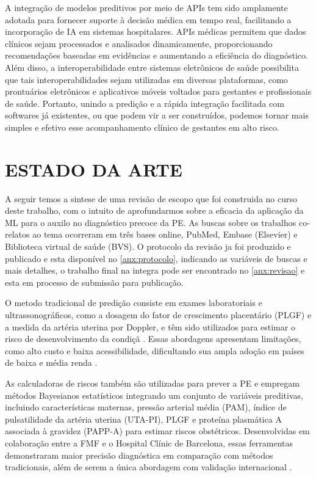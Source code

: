 \documentclass[12pt, a4paper]{report}
\theoremstyle{definition}
\theoremstyle{remark}
\theoremstyle{plain}
\begin{document}
A integração de modelos preditivos por meio de APIs tem sido amplamente adotada para fornecer suporte à decisão médica em tempo real, facilitando a incorporação de IA em sistemas hospitalares. APIs médicas permitem que dados clínicos sejam processados e analisados dinamicamente, proporcionando recomendações baseadas em evidências e aumentando a eficiência do diagnóstico\cite{mandel2016}. Além disso, a interoperabilidade entre sistemas eletrônicos de saúde possibilita que tais interoperabilidades sejam utilizadas em diversas plataformas, como prontuários eletrônicos e aplicativos móveis voltados para gestantes e profissionais de saúde\cite{himss2020}. Portanto, unindo a predição e a rápida integração facilitada com softwares já existentes, ou que podem vir a ser construídos, podemos tornar mais simples e efetivo esse acompanhamento clínico de gestantes em alto risco.


\chapter{ESTADO DA ARTE}
\thispagestyle{myheadings}

A seguir temos a sintese de uma revisão de escopo que foi construida no curso deste trabalho, com o intuito de aprofundarmos sobre a eficacia da aplicação da ML para o auxilo no diagnóstico precoce da PE. As buscas sobre os trabalhos co-relatos ao tema ocorreram em três bases online, PubMed, Embase (Elsevier) e Biblioteca virtual de saúde (BVS). O protocolo da revisão ja foi produzido e publicado e esta disponível no \autoref{anx:protocolo}, indicando as variáveis de buscas e mais detalhes, o trabalho final na integra pode ser encontrado no \autoref{anx:revisao} e esta em processo de submissão para publicação.

O metodo tradicional de predição consiste em exames laboratoriais e ultrassonográficos, como a dosagem do fator de crescimento placentário (PLGF) e a medida da artéria uterina por Doppler, e têm sido utilizados para estimar o risco de desenvolvimento da condiçã \cite{Poon2014}. Essas abordagens apresentam limitações, como alto custo e baixa acessibilidade, dificultando sua ampla adoção em países de baixa e média renda \cite{who2019}.

As calculadoras de riscos também são utilizadas para prever a PE e empregam métodos Bayesianos estatísticos integrando um conjunto de variáveis preditivas, incluindo características maternas, pressão arterial média (PAM), índice de pulsatilidade da artéria uterina (UTA-PI), PLGF e proteína plasmática A associada à gravidez (PAPP-A) para estimar riscos obstétricos. Desenvolvidas em colaboração entre a FMF e o Hospital Clínic de Barcelona, essas ferramentas demonstraram maior precisão diagnóstica em comparação com métodos tradicionais, além de serem a única abordagem com validação internacional \cite{Riishede2023}.
\end{document}
